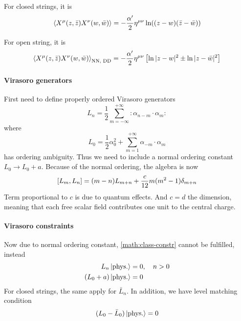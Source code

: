 \documentclass[12pt, a4paper, DIV=15]{article}
\numberwithin{equation}{section}
\newcommand{\normord}[1]{:\mathrel{#1}:}
\begin{document}
For closed strings, it is
\begin{equation}
	\expval{X^\mu(z,\bar{z}) X^\nu (w, \bar{w})} = - \frac{\alpha'}{2} \eta^{\mu\nu} \ln((z-w)(\bar{z}-\bar{w}))
\end{equation}

For open string, it is
\begin{equation}
	\expval{X^\mu(z,\bar{z}) X^\nu (w, \bar{w})}_{\text{NN, DD}} = - \frac{\alpha'}{2} \eta^{\mu\nu} \left[ \ln|z-w|^2 \pm \ln|z-\bar{w}|^2 \right]
\end{equation}

\paragraph{Virasoro generators}
First need to define properly ordered Virasoro generators
\begin{equation}
	L_n = \frac{1}{2} \sum_{m=-\infty}^{+\infty} \normord{\alpha_{n-m}\cdot \alpha_m}
\end{equation}
where
\begin{equation}
	L_0 = \frac{1}{2} \alpha_0^2 + \sum_{m=1}^{+\infty} \alpha_{-m} \cdot \alpha_m
	\label{math:L0}
\end{equation}
has ordering ambiguity. Thus we need to include a normal ordering constant $L_0 \rightarrow L_0 + a$. Because of the normal ordering, the algebra is now
\begin{equation}
	\comm{L_m}{L_n} = (m-n) L_{m+n} + \frac{c}{12} m (m^2 - 1) \delta_{m+n}
	\label{math:L-comm}
\end{equation}
Term proportional to $c$ is due to quantum effects. And $c=d$ the dimension, meaning that each free scalar field contributes one unit to the central charge.

\paragraph{Virasoro constraints}
Now due to normal ordering constant, \eqref{math:class-constr} cannot be fulfilled, instead
\begin{subequations}
\begin{align}
	L_n \ket{\text{phys.}} &= 0, \quad n > 0\\
	(L_0 + a) \ket{\text{phys.}} &= 0
\end{align}
\label{math:quan-constr}
\end{subequations}
For closed strings, the same apply for $\bar{L}_n$. In addition, we have level matching condition
\begin{equation}
	(L_0 - \bar{L}_0) \ket{\text{phys.}} = 0
\end{equation}
\end{document}
